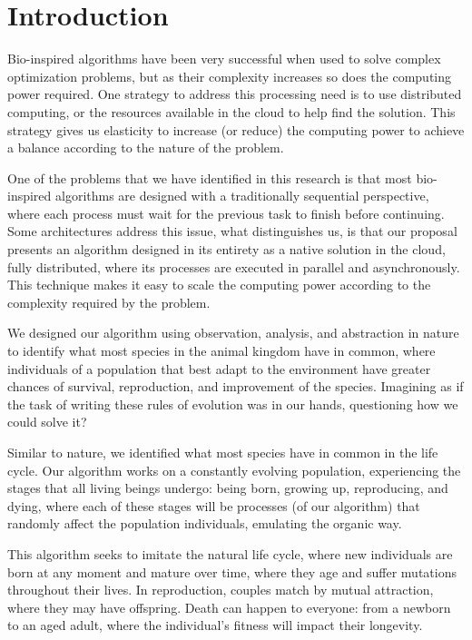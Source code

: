 \documentclass[runningheads]{llncs}
\begin{document}
\section{Introduction} 

Bio-inspired algorithms have been very successful when used to solve complex
optimization problems, but as their complexity increases so does the computing
power required. One strategy to address this processing need is to use
distributed computing, or the resources available in the cloud to help find the
solution. This strategy gives us elasticity to increase (or reduce) the
computing power to achieve a balance according to the nature of the problem.

One of the problems that we have identified in this research is that most
bio-inspired algorithms are designed with a traditionally sequential
perspective, where each process must wait for the previous task to finish
before continuing. Some architectures address this issue, what distinguishes
us, is that our proposal presents an algorithm designed in its entirety as a
native solution in the cloud, fully distributed, where its processes are
executed in parallel and asynchronously. This technique makes it easy to scale
the computing power according to the complexity required by the problem.

We designed our algorithm using observation, analysis, and abstraction in
nature to identify what most species in the animal kingdom have in common,
where individuals of a population that best adapt to the environment have
greater chances of survival, reproduction, and improvement of the species.
Imagining as if the task of writing these rules of evolution was in our hands,
questioning how we could solve it?

Similar to nature, we identified what most species have in common in the life
cycle. Our algorithm works on a constantly evolving population, experiencing
the stages that all living beings undergo: being born, growing up, reproducing,
and dying, where each of these stages will be processes (of our algorithm) that
randomly affect the population individuals, emulating the organic way.

This algorithm seeks to imitate the natural life cycle, where new individuals
are born at any moment and mature over time, where they age and suffer
mutations throughout their lives. In reproduction, couples match by mutual
attraction, where they may have offspring. Death can happen to everyone: from a
newborn to an aged adult, where the individual's fitness will impact their
longevity.
\end{document}
